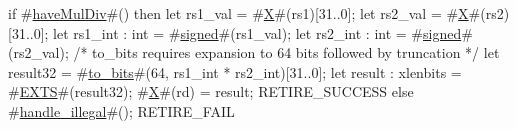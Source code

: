 if #\hyperref[sailRISCVzhaveMulDiv]{haveMulDiv}#() then {
  let rs1_val = #\hyperref[sailRISCVzX]{X}#(rs1)[31..0];
  let rs2_val = #\hyperref[sailRISCVzX]{X}#(rs2)[31..0];
  let rs1_int : int = #\hyperref[sailRISCVzsigned]{signed}#(rs1_val);
  let rs2_int : int = #\hyperref[sailRISCVzsigned]{signed}#(rs2_val);
  /* to_bits requires expansion to 64 bits followed by truncation */
  let result32 = #\hyperref[sailRISCVztozybits]{to\_bits}#(64, rs1_int * rs2_int)[31..0];
  let result : xlenbits = #\hyperref[sailRISCVzEXTS]{EXTS}#(result32);
  #\hyperref[sailRISCVzX]{X}#(rd) = result;
  RETIRE_SUCCESS
} else {
  #\hyperref[sailRISCVzhandlezyillegal]{handle\_illegal}#();
  RETIRE_FAIL
}
